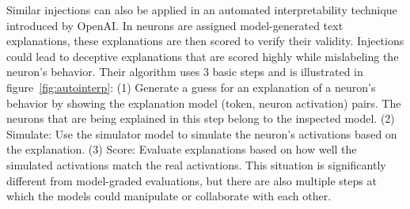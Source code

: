Similar injections can also be applied in an automated interpretability technique introduced by OpenAI. In \citet{bills2023language} neurons are assigned model-generated text explanations, these explanations are then scored to verify their validity. Injections could lead to deceptive explanations that are scored highly while mislabeling the neuron's behavior.
Their algorithm uses 3 basic steps and is illustrated in figure~\ref{fig:autointerp}: (1) Generate a guess for an explanation of a neuron’s behavior by showing the explanation model (token, neuron activation) pairs. The neurons that are being explained in this step belong to the inspected model.
(2) Simulate: Use the simulator model to simulate the neuron's activations based on the explanation.
(3) Score: Evaluate explanations based on how well the simulated activations match the real activations.
This situation is significantly different from model-graded evaluations, but there are also multiple steps at which the models could manipulate or collaborate with each other.

  

